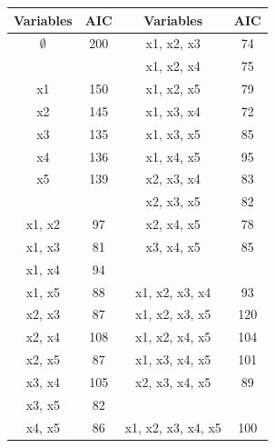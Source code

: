 \documentclass[a4paper,12pt]{article}
\begin{document}
{
	\large
	\begin{center}
		\begin{tabular}{||c|c||c|c||}
			\hline
			Variables & AIC & Variables & AIC \\ \hline \hline
			$\emptyset$	&	200	&	x1, x2, x3	&	74	\\ \hline
			\phantom{makemakespace}
			&	\phantom{makespace}
			&	x1, x2, x4	&	75	\\ \hline
			x1	&	150	&	x1, x2, x5	&	79	\\ \hline
			x2	&	145	&	x1, x3, x4	&	72	\\ \hline
			x3	&	135	&	x1, x3, x5	&	85	\\ \hline
			x4	&	136	&	x1, x4, x5	&	95	\\ \hline
			x5	&	139	&	x2, x3, x4	&	83	\\ \hline
			&		&	x2, x3, x5	&	82	\\ \hline
			x1, x2	&	97	&	x2, x4, x5	&	78	\\ \hline
			x1, x3	&	81	&	x3, x4, x5	&	85	\\ \hline
			x1, x4	&	94	&	\phantom{makemakespace}
			&	\phantom{makespace}
			\\ \hline
			x1, x5	&	88	&	x1, x2, x3, x4	&	93	\\ \hline
			x2, x3	&	87	&	x1, x2, x3, x5	&	120	\\ \hline
			x2, x4	&	108	&	x1, x2, x4, x5	&	104	\\ \hline
			x2, x5	&	87	&	x1, x3, x4, x5	&	101	\\ \hline
			x3, x4	&	105	&	x2, x3, x4, x5	&	89	\\ \hline
			x3, x5	&	82	&		&		\\ \hline
			x4, x5	&	86	&	x1, x2, x3, x4, x5	&	100	\\ \hline
		\end{tabular} 
	\end{center}
}
\newpage
\end{document}
